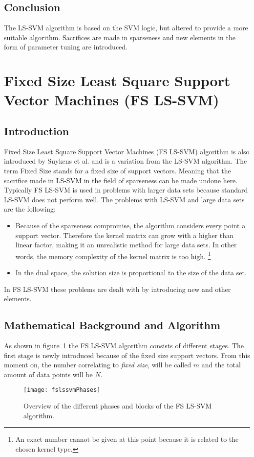 \subsection{Conclusion}
The LS-SVM algorithm is based on the SVM logic, but altered to provide a more suitable algorithm.
Sacrifices are made in sparseness and new elements in the form of parameter tuning are introduced.
\section{Fixed Size Least Square Support Vector Machines (FS LS-SVM)}
\subsection{Introduction}
Fixed Size Least Square Support Vector Machines (FS LS-SVM) algorithm is also introduced by Suykens et al. \cite{Suykens2002} and is a variation from the LS-SVM algorithm.
The term Fixed Size stands for a fixed size of support vectors. 
Meaning that the sacrifice made in LS-SVM in the field of sparseness can be made undone here.
Typically FS LS-SVM is used in problems with larger data sets because standard LS-SVM does not perform well.
The problems with LS-SVM and large data sets are the following:
\begin{itemize}
	\item Because of the sparseness compromise, the algorithm considers every point a support vector. 
	Therefore the kernel matrix can grow with a higher than linear factor, making it an unrealistic method for large data sets. In other words, the memory complexity of the kernel matrix is too high. \footnote{An exact  number cannot be given at this point because it is related to the chosen kernel type.}
	\item In the dual space, the solution size is proportional to the size of the data set. 
\end{itemize}
In FS LS-SVM these problems are dealt with by introducing new and other elements.
\subsection{Mathematical Background and Algorithm}
As shown in figure~\ref{fig:fslssvmDetailedOverview} the FS LS-SVM algorithm consists of different stages.
The first stage is newly introduced because of the fixed size support vectors.
From this moment on, the number correlating to \textit{fixed size}, will be called $m$ and the total amount of data points will be $N$.
\begin{figure}
	\centering
	\texttt{[image: fslssvmPhases]}
	\caption{Overview of the different phases and blocks of the FS LS-SVM algorithm.}
	\label{fig:fslssvmDetailedOverview}
\end{figure}
